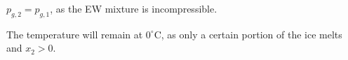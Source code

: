\( p_{g,2} = p_{g,1} \), as the EW mixture is incompressible.  

The temperature will remain at \( 0^\circ \text{C} \), as only a certain portion of the ice melts and \( x_2 > 0 \).